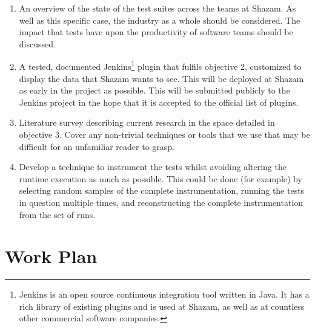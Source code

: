 \begin{enumerate}
	\item{
		An overview of the state of the test suites across the teams at Shazam. As
		well as this specific case, the industry as a whole should be considered.
		The impact that \flaky tests have upon the productivity of software teams
		should be discussed.
	}
	\item{
		A tested, documented Jenkins\footnote{Jenkins is an open source continuous
		integration tool written in Java. It has a rich library of existing plugins
		and is used at Shazam, as well as at countless other commercial software
		companies.} plugin that fulfils objective 2, customized to display the data
		that Shazam wants to see. This will be deployed at Shazam as early in the
		project as possible. This will be submitted publicly to the Jenkins project
		in the hope that it is accepted to the official list of plugins.
	}
	\item{
		Literature survey describing current research in the space detailed in
		objective 3. Cover any non-trivial techniques or tools that we use that may
		be difficult for an unfamiliar reader to grasp.
	}
	\item{
		Develop a technique to instrument the \flaky tests whilst avoiding altering
		the runtime execution as much as possible. This could be done (for example)
		by selecting random samples of the complete instrumentation, running the
		tests in question multiple times, and reconstructing the complete
		instrumentation from the set of runs.
	}
\end{enumerate}

\section{Work Plan}

